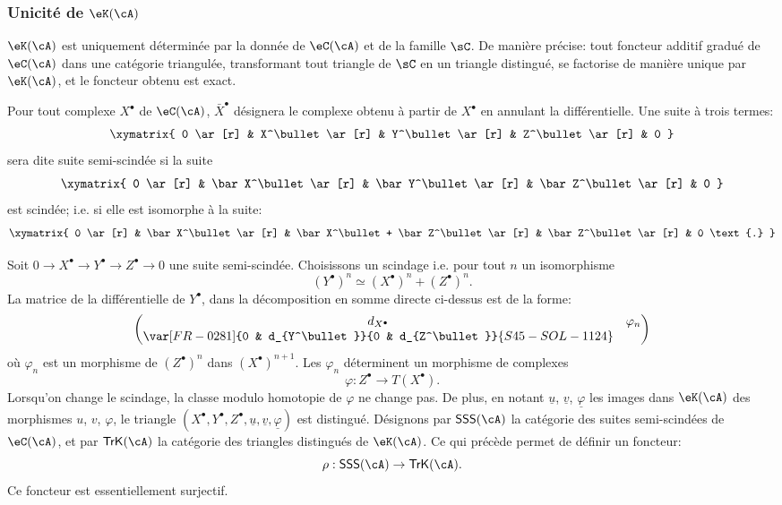 \subsubsection{Unicité de $\eK(\cA)$}\label{VIII:1-2-4}

$\eK(\cA)$ est uniquement déterminée par la donnée de $\eC(\cA)$ et de la 
famille $\sC$. De manière précise: tout foncteur additif gradué de 
$\eC(\cA)$ dans une catégorie triangulée, transformant tout triangle de 
$\sC$ en un triangle distingué, se factorise de manière unique par 
$\eK(\cA)$, et le foncteur obtenu est exact. 

Pour tout complexe $X^\bullet$ de $\eC(\cA)$, $\bar X^\bullet$ désignera le 
complexe obtenu à partir de $X^\bullet$ en annulant la différentielle. Une 
suite à trois termes: 
\[\xymatrix{
  0 \ar[r] 
    & X^\bullet \ar[r] 
    & Y^\bullet \ar[r] 
    & Z^\bullet \ar[r] 
    & 0 
}\]
sera dite suite semi-scindée si la suite 
\[\xymatrix{
  0 \ar[r] 
    & \bar X^\bullet \ar[r] 
    & \bar Y^\bullet \ar[r] 
    & \bar Z^\bullet \ar[r] 
    & 0 
}\]
est scindée; i.e. si elle est isomorphe à la suite: 
\[\xymatrix{
  0 \ar[r] 
    & \bar X^\bullet \ar[r] 
    & \bar X^\bullet + \bar Z^\bullet \ar[r] 
    & \bar Z^\bullet \ar[r] 
    & 0 \text{.}
}\]

Soit $0 \to X^\bullet \to Y^\bullet \to Z^\bullet \to 0$ une suite 
semi-scindée. Choisissons un scindage i.e. pour tout $n$ un isomorphisme 
\[
  (Y^\bullet)^n \simeq (X^\bullet)^n + (Z^\bullet)^n \text{.}
\]
La matrice de la différentielle de $Y^\bullet$, dans la décomposition en 
somme directe ci-dessus est de la forme: 
\[
  \begin{pmatrix}
    d_{X^\bullet} & \varphi_n \\
    \var[FR-0281]{0 & d_{Y^\bullet}}{0 & d_{Z^\bullet}}{S45-SOL-1124} 
  \end{pmatrix}
\]
où $\varphi_n$ est un morphisme de $(Z^\bullet)^n$ dans 
$(X^\bullet)^{n+1}$. Les $\varphi_n$ déterminent un morphisme de complexes 
\[
  \varphi:Z^\bullet \to T(X^\bullet) \text{.}
\]
Lorsqu'on change le scindage, la classe modulo homotopie de $\varphi$ ne 
change pas. De plus, en notant $\underline u$, $\underline v$, 
$\underline\varphi$ les images dans $\eK(\cA)$ des morphismes $u$, $v$, 
$\varphi$, le triangle 
$(X^\bullet,Y^\bullet,Z^\bullet,\underline u,\underline v,\underline\varphi)$ 
est distingué. Désignons par $\mathsf{SSS}(\cA)$ la catégorie des 
suites semi-scindées de $\eC(\cA)$, et par $\mathsf{TrK}(\cA)$ la 
catégorie des triangles distingués de $\eK(\cA)$. Ce qui précède 
permet de définir un foncteur: 
\[
  \rho:\mathsf{SSS}(\cA) \to \mathsf{TrK}(\cA) \text{.}
\]
Ce foncteur est essentiellement surjectif. 










